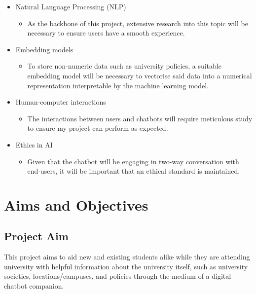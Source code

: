 \documentclass[12pt]{report}
\begin{document}
    \begin{itemize}
        \item Natural Language Processing (NLP) 
            \begin{itemize}
                \item As the backbone of this project, extensive research into this topic will be necessary 
                to ensure users have a smooth experience.
            \end{itemize}
        \item Embedding models
            \begin{itemize}
                \item To store non-numeric data such as university policies, a suitable embedding model
                will be necessary to vectorise said data into a numerical representation interpretable by
                the machine learning model.
            \end{itemize}
        \item Human-computer interactions
            \begin{itemize}
                \item The interactions between users and chatbots will require meticulous study to ensure
                my project can perform as expected.
            \end{itemize}
        \item Ethics in AI
        \begin{itemize}
            \item Given that the chatbot will be engaging in two-way conversation with end-users, it will
            be important that an ethical standard is maintained.
        \end{itemize}
    \end{itemize}

    \chapter{Aims and Objectives}
    \section{Project Aim}
    This project aims to aid new and existing students alike while they are attending university with 
    helpful information about the university itself, such as university societies, locations/campuses, 
    and policies through the medium of a digital chatbot companion.
\end{document}
